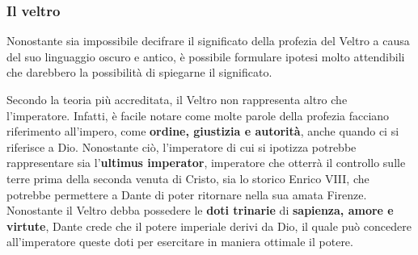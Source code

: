 \documentclass[10pt,a4paper]{article}
\begin{document}
		\subsubsection{Il veltro}
		
		Nonostante sia impossibile decifrare il significato della profezia del Veltro a causa del suo linguaggio oscuro e antico, è possibile formulare ipotesi molto attendibili che darebbero la possibilità di spiegarne il significato.
		
		Secondo la teoria più accreditata, il Veltro non rappresenta altro che l'imperatore. Infatti, è facile notare come molte parole della profezia facciano riferimento all'impero, come \textbf{ordine, giustizia e autorità}, anche quando ci si riferisce a Dio. Nonostante ciò, l'imperatore di cui si ipotizza potrebbe rappresentare sia l'\textbf{ultimus imperator}, imperatore che otterrà il controllo sulle terre prima della seconda venuta di Cristo, sia lo storico Enrico VIII, che potrebbe permettere a Dante di poter ritornare nella sua amata Firenze. Nonostante il Veltro debba possedere le \textbf{doti trinarie} di \textbf{sapienza, amore e virtute}, Dante crede che il potere imperiale derivi da Dio, il quale può concedere all'imperatore queste doti per esercitare in maniera ottimale il potere. 
 	
\end{document}

